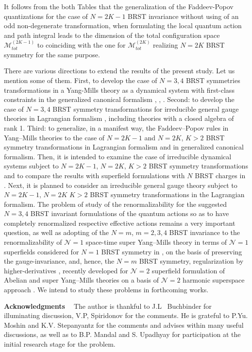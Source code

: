 \documentclass[10pt]{article}
\begin{document}
It follows from the both Tables that the generalization of the Faddeev-Popov quantizations for the case of $N=2K-1$ BRST invariance without using
of an odd non-degenerate transformation, when formulating the local quantum action and  path integral leads to the dimension of the total configuration space  $\mathcal{M}^{(2K-1)}_{tot}$ to coinciding with the one for $\mathcal{M}^{(2K)}_{tot}$ realizing $N=2K$ BRST symmetry for the same purpose.

There are various directions to extend the results of the present study.
Let us mention some of them. First, to develop the case of $N=3, 4$ BRST symmetries
transformations in a Yang-Mills theory as a dynamical system with first-class
constraints in the generalized canonical formalism \cite{bfv}, \cite{bfv1}, \cite{Henneaux1}.
Second: to develop the case of $N=3, 4$ BRST symmetry transformations
for irreducible general gauge theories in Lagrangian formalism \cite{bv},
including theories with a closed algebra of rank 1. Third: to generalize,
in a manifest way, the Faddeev--Popov rules in Yang--Mills theories to the case
of $N=2K-1$ and $N=2K$, $K>2$ BRST symmetry transformations in Lagrangian formalism
and in generalized canonical formalism. Then, it is intended to examine
the case of irreducible dynamical systems subject to $N=2K-1$, $N=2K$, $K>2$
BRST symmetry transformations  and to compare the
results with superfield formulations with $N$ BRST charges in
\cite{Nsupercharge}. Next, it is planned to consider an
irreducible general gauge theory subject to $N=2K-1$, $N=2K$ $K>2$
 BRST symmetry transformations
in the Lagrangian formalism. The problem  of  study of the  renormalizability  for the suggested $N=3, 4$ BRST invariant formulations of the quantum actions  so as to have
completely renormalized respective effective actions  remains a
very important question, as well as adopting of the $N=m$,
$m=2,3,4$ BRST invariance to the renormalizability of
$\mathcal{N}=1$ space-time super Yang--Mills theory in terms of
$\mathcal{N}=1$ superfields considered for $N=1$ BRST symmetry in
\cite{Piguet}, \cite{Stepanyantz} on the basis of preserving the
gauge-invariance, and, hence, the $N=m$ BRST symmetry,
regularization by higher-derivatives \cite{Slavnov:1972sq},
recently developed for $\mathcal{N}=2$ superfield formulation of
Abelian and super Yang--Mills theories
\cite{BuchbinderStepanyantz} on a basis of $\mathcal{N}=2$
harmonic superspace approach \cite{harmonic}.  We intend to study these problems in forthcoming works.

\vspace{1ex} \noindent \textbf{Acknowledgments \ } The author is thankful to J.L~ Buchbinder for illuminating discussion,  V.P, Spiridonov for the comments. He is  grateful to P.Yu. Moshin  and  K.V. Stepanyantz for the comments and advises  within
  many useful  discussions, as well as to B.P. Mandal and S. Upadhyay for participation at the initial
research stage for the problem.
\end{document}
